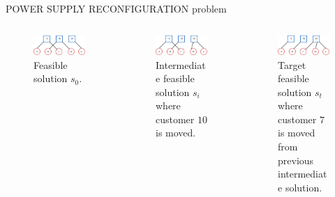 \begin{frame}{POWER SUPPLY RECONFIGURATION problem}
\begin{columns}
    \begin{column}{0.3\textwidth}
        \begin{figure}
        \centering
        \includegraphics[width=1.1\textwidth]{img/ps2.pdf}
        \caption{Feasible solution $s_0$.\hfill \break \hfill \break \hfill \break \hfill \break}
        \label{fig:circle}
        \end{figure}
    \end{column}
    \begin{column}{0.3\textwidth}
        \begin{figure}
        \centering
        \includegraphics[width=1.1\textwidth]{img/ps3.pdf}
        \caption{Intermediate feasible solution $s_i$ where customer $10$ is moved.\hfill \break \hfill \break}
        \label{fig:circle}
        \end{figure}
    \end{column}
    \begin{column}{0.3\textwidth}
        \begin{figure}
        \centering
        \includegraphics[width=1.1\textwidth]{img/ps4.pdf}
        \caption{Target feasible solution $s_t$ where customer $7$ is moved from previous intermediate solution.\hfill \break}
        \label{fig:circle}
        \end{figure}
    \end{column}
\end{columns}


\end{frame}
